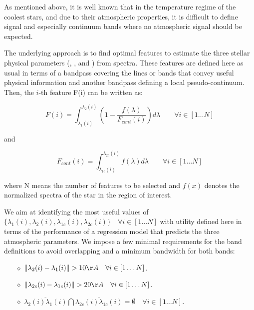 As mentioned above, it is well known that in the temperature regime of
the coolest stars, and due to their atmospheric properties, it is
difficult to define signal and especially continuum bands where no
atmospheric signal should be expected.

The underlying approach is to find optimal features to estimate the
three stellar physical parameters (\teff, \logg, and \metal) from
spectra. These features are defined here as usual in terms of a
bandpass covering the lines or bands that convey useful physical
information and another bandpass defining a local
pseudo-continuum. Then, the $i$-th feature F(i) can be written as:

\begin{equation}\label{eq:feature}
  F(i) =  \int_{\lambda_{1}(i)}^{\lambda_{2}(i)} \left( 1 - \frac{f(\lambda)}{F_{cont}(i)}\right) d{\lambda}  \quad \quad \forall i \in [1 \ldots N]
\end{equation}

and 

\begin{equation}\label{eq:cont}
 F_{cont}(i) =  \int_{\lambda_{1c}(i)}^{\lambda_{2c}(i)} f(\lambda) d{\lambda}   \quad \quad \forall i \in [1 \ldots N]
\end{equation}

where N means the number of features to be selected and $f(x)$ denotes
the normalized spectra of the star in the region of interest.


We aim at identifying the most useful values of
$\{\lambda_{1}(i),\lambda_{2}(i), \lambda_{1c}(i),\lambda_{2c}(i)\}
\quad \forall i \in [1 \ldots N] $ with utility defined here in terms
of the performance of a regression model that predicts the three
atmospheric parameters. We impose a few minimal requirements for the
band definitions to avoid overlapping and a minimum bandwidth for both
bands:

\begin{itemize}
 \item[$\diamond$]{ $ \lVert \lambda_{2}(i) - \lambda_{1}(i) \rVert  > 10 \AA \quad \forall i \in [1 \ldots N]$.}
 \item[$\diamond$]{ $ \lVert \lambda_{2c}(i) - \lambda_{1c}(i) \rVert  > 20 \AA \quad \forall i \in [1 \ldots N]$.} 
 \item[$\diamond$]{ $ \overline{\lambda_{2}(i)\lambda_{1}(i)}  \bigcap 
                      \overline{\lambda_{2c}(i)\lambda_{1c}(i)} = \emptyset \quad \forall i \in [1 \ldots N]$.}
\end{itemize}


